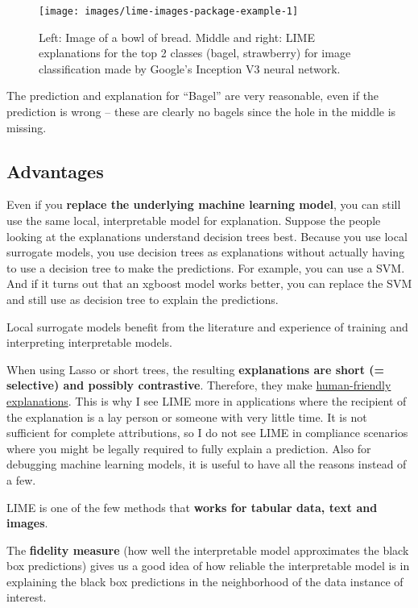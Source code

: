 \documentclass[
  12pt,
]{krantz}
\begin{document}
\begin{figure}

{\centering \texttt{[image: images/lime-images-package-example-1]} 

}

\caption{Left: Image of a bowl of bread. Middle and right: LIME explanations for the top 2 classes (bagel, strawberry) for image classification made by Google's Inception V3 neural network.}\label{fig:lime-images-package-example-include}
\end{figure}

The prediction and explanation for ``Bagel'' are very reasonable, even if the prediction is wrong -- these are clearly no bagels since the hole in the middle is missing.

\hypertarget{advantages-13}{%
\subsection{Advantages}\label{advantages-13}}

Even if you \textbf{replace the underlying machine learning model}, you can still use the same local, interpretable model for explanation.
Suppose the people looking at the explanations understand decision trees best.
Because you use local surrogate models, you use decision trees as explanations without actually having to use a decision tree to make the predictions.
For example, you can use a SVM.
And if it turns out that an xgboost model works better, you can replace the SVM and still use as decision tree to explain the predictions.

Local surrogate models benefit from the literature and experience of training and interpreting interpretable models.

When using Lasso or short trees, the resulting \textbf{explanations are short (= selective) and possibly contrastive}.
Therefore, they make \protect\hyperlink{explanation}{human-friendly explanations}.
This is why I see LIME more in applications where the recipient of the explanation is a lay person or someone with very little time.
It is not sufficient for complete attributions, so I do not see LIME in compliance scenarios where you might be legally required to fully explain a prediction.
Also for debugging machine learning models, it is useful to have all the reasons instead of a few.

LIME is one of the few methods that \textbf{works for tabular data, text and images}.

The \textbf{fidelity measure} (how well the interpretable model approximates the black box predictions) gives us a good idea of how reliable the interpretable model is in explaining the black box predictions in the neighborhood of the data instance of interest.
\end{document}
